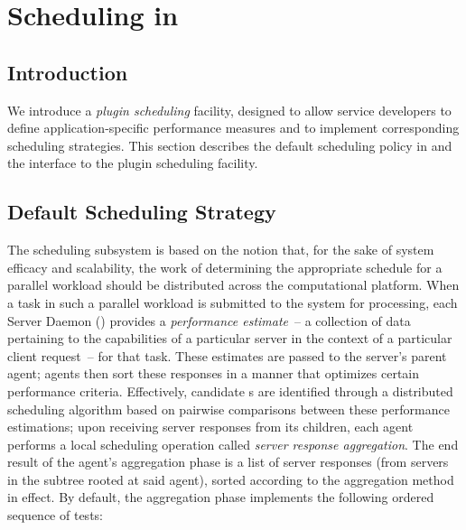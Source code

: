 

\newenvironment{code}
{\begin{list}{}{\setlength{\leftmargin}{1em}}\item\bfseries\tt}
{\end{list}}

\newenvironment{tinycode}
{\begin{list}{}{\setlength{\leftmargin}{1em}}\item\tiny\bfseries\tt}
{\end{list}}


\chapter{Scheduling in \diet}
\label{ch:plugin}

\section{Introduction}

We introduce a \emph{plugin scheduling} facility, designed to allow \diet
service developers to define application-specific performance measures and to
implement corresponding scheduling strategies. This section describes the
default scheduling policy in \diet and the interface to the plugin scheduling
facility.

\section{Default Scheduling Strategy}\label{sect:default_sched}

The \diet scheduling subsystem is based on the notion that, for the sake of
system efficacy and scalability, the work of determining the appropriate
schedule for a parallel workload should be distributed across the computational
platform.  When a task in such a parallel workload is submitted to the system
for processing, each Server Daemon (\sed) provides a \emph{performance
  estimate}~-- a collection of data pertaining to the capabilities of a
particular server in the context of a particular client request~-- for that
task.  These estimates are passed to the server's parent agent; agents then
sort these responses in a manner that optimizes certain performance criteria.
Effectively, candidate {\sed}s are identified through a distributed scheduling
algorithm based on pairwise comparisons between these performance estimations;
upon receiving server responses from its children, each agent performs a local
scheduling operation called \emph{server response aggregation}.  The end result
of the agent's aggregation phase is a list of server responses (from servers in
the subtree rooted at said agent), sorted according to the aggregation method
in effect. By default, the aggregation phase implements the following ordered
sequence of tests:


